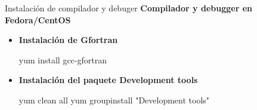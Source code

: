 \begin{frame}[fragile]{Instalación de compilador y debuger}
  \textbf{Compilador y debugger en Fedora/CentOS}
\begin{itemize}[<+(1)->] 
\item	\textbf{Instalación de Gfortran}
    \begin{mintedbash}
       yum install gcc-gfortran
   	\end{mintedbash}
  \item	\textbf{Instalación del paquete Development tools}
    \begin{mintedbash}
       yum clean all
       yum groupinstall "Development tools" 
	  \end{mintedbash}
\end{itemize}
\end{frame}

